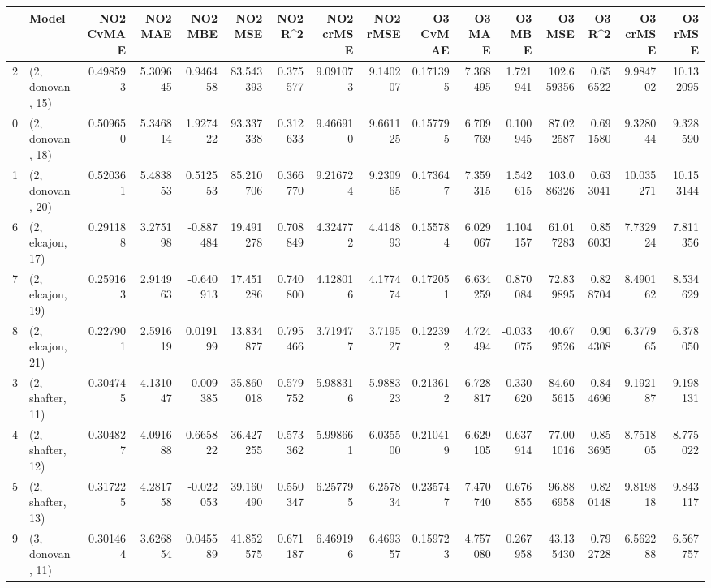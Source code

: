 \begin{tabular}{llrrrrrrrrrrrrrr}
\toprule
{} &             Model &  NO2 CvMAE &   NO2 MAE &   NO2 MBE &    NO2 MSE &   NO2 R\textasciicircum2 &  NO2 crMSE &  NO2 rMSE &  O3 CvMAE &    O3 MAE &    O3 MBE &      O3 MSE &    O3 R\textasciicircum2 &   O3 crMSE &    O3 rMSE \\
\midrule
2  &  (2, donovan, 15) &   0.498593 &  5.309645 &  0.946458 &  83.543393 &  0.375577 &   9.091073 &  9.140207 &  0.171395 &  7.368495 &  1.721941 &  102.659356 &  0.656522 &   9.984702 &  10.132095 \\
0  &  (2, donovan, 18) &   0.509650 &  5.346814 &  1.927422 &  93.337338 &  0.312633 &   9.466910 &  9.661125 &  0.157795 &  6.709769 &  0.100945 &   87.022587 &  0.691580 &   9.328044 &   9.328590 \\
1  &  (2, donovan, 20) &   0.520361 &  5.483853 &  0.512553 &  85.210706 &  0.366770 &   9.216724 &  9.230965 &  0.173647 &  7.359315 &  1.542615 &  103.086326 &  0.633041 &  10.035271 &  10.153144 \\
6  &  (2, elcajon, 17) &   0.291188 &  3.275198 & -0.887484 &  19.491278 &  0.708849 &   4.324772 &  4.414893 &  0.155784 &  6.029067 &  1.104157 &   61.017283 &  0.856033 &   7.732924 &   7.811356 \\
7  &  (2, elcajon, 19) &   0.259163 &  2.914963 & -0.640913 &  17.451286 &  0.740800 &   4.128016 &  4.177474 &  0.172051 &  6.634259 &  0.870084 &   72.839895 &  0.828704 &   8.490162 &   8.534629 \\
8  &  (2, elcajon, 21) &   0.227901 &  2.591619 &  0.019199 &  13.834877 &  0.795466 &   3.719477 &  3.719527 &  0.122392 &  4.724494 & -0.033075 &   40.679526 &  0.904308 &   6.377965 &   6.378050 \\
3  &  (2, shafter, 11) &   0.304745 &  4.131047 & -0.009385 &  35.860018 &  0.579752 &   5.988316 &  5.988323 &  0.213612 &  6.728817 & -0.330620 &   84.605615 &  0.844696 &   9.192187 &   9.198131 \\
4  &  (2, shafter, 12) &   0.304827 &  4.091688 &  0.665822 &  36.427255 &  0.573362 &   5.998661 &  6.035500 &  0.210419 &  6.629105 & -0.637914 &   77.001016 &  0.853695 &   8.751805 &   8.775022 \\
5  &  (2, shafter, 13) &   0.317225 &  4.281758 & -0.022053 &  39.160490 &  0.550347 &   6.257795 &  6.257834 &  0.235747 &  7.470740 &  0.676855 &   96.886958 &  0.820148 &   9.819818 &   9.843117 \\
9  &  (3, donovan, 11) &   0.301464 &  3.626854 &  0.045589 &  41.852575 &  0.671187 &   6.469196 &  6.469357 &  0.159723 &  4.757080 &  0.267958 &   43.135430 &  0.792728 &   6.562288 &   6.567757 \\

\end{tabular}
